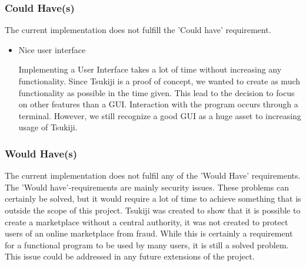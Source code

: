 \subsubsection{Could Have(s)}
The current implementation does not fulfill the 'Could have' requirement.

\begin{itemize}
\item Nice user interface

Implementing a User Interface takes a lot of time without increasing any functionality.
Since Tsukiji is a proof of concept, we wanted to create as much functionality as possible in the time given.
This lead to the decision to focus on other features than a GUI.
Interaction with the program occurs through a terminal.
However, we still recognize a good GUI as a huge asset to increasing usage of Tsukiji.
\end{itemize}

\subsubsection{Would Have(s)}
The current implementation does not fulfil any of the 'Would Have' requirements.
The 'Would have'-requirements are mainly security issues.
These problems can certainly be solved, but it would require a lot of time to achieve something that is outside the scope of this project.
Tsukiji was created to show that it is possible to create a marketplace without a central authority, it was not created to protect users of an online marketplace from fraud.
While this is certainly a requirement for a functional program to be used by many users, it is still a solved problem.
This issue could be addressed in any future extensions of the project.

